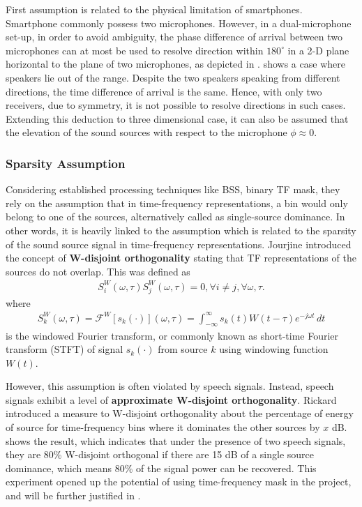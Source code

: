 \documentclass[a4paper,twoside,12pt,hidelinks]{article}
\begin{document}
First assumption is related to the physical limitation of smartphones. Smartphone commonly possess two microphones. However, in a dual-microphone set-up, in order to avoid ambiguity, the phase difference of arrival between two microphones can at most be used to resolve direction within $180^{\circ}$ in a 2-D plane horizontal to the plane of two microphones, as depicted in .  shows a case where speakers lie out of the range. Despite the two speakers speaking from different directions, the time difference of arrival is the same. Hence, with only two receivers, due to symmetry, it is not possible to resolve directions in such cases. Extending this deduction to three dimensional case, it can also be assumed that the elevation of the sound sources with respect to the microphone $\phi \approx 0$. 

\subsubsection{Sparsity Assumption}
Considering established processing techniques like BSS, binary TF mask, they rely on the assumption that in time-frequency representations, a bin would only belong to one of the sources, alternatively called as single-source dominance. In other words, it is heavily linked to the assumption which is related to the sparsity of the sound source signal in time-frequency representations. Jourjine \cite{JourjineBlindMixtures} introduced the concept of \textbf{W-disjoint orthogonality} stating that TF representations of the sources do not overlap. This was defined as
\begin{align}
S_i^W(\omega, \tau)S_j^W(\omega, \tau) = 0, \forall i \neq j, \forall \omega, \tau. \label{eqn:wdisjoint}
\end{align}
where 
\begin{align}
S_k^W(\omega, \tau)=\mathcal{F}^W[s_k(\cdot)](\omega, \tau)=\int_{-\infty}^{\infty }s_k(t)W(t-\tau )e^{-j\omega t}\,dt
\end{align}
is the windowed Fourier transform, or commonly known as short-time Fourier transform (STFT) of signal $s_k(\cdot)$ from source $k$ using windowing function $W(t)$. 

However, this assumption is often violated by speech signals. Instead, speech signals exhibit a level of \textbf{approximate W-disjoint orthogonality}. Rickard \cite{Rickard2002OnSpeech} introduced a measure to W-disjoint orthogonality about the percentage of energy of source for time-frequency bins where it dominates the other sources by $x$ dB.  shows the result, which indicates that under the presence of two speech signals, they are 80\% W-disjoint orthogonal if there are 15 dB of a single source dominance, which means 80\% of the signal power can be recovered. This experiment opened up the potential of using time-frequency mask in the project, and will be further justified in .
\end{document}
